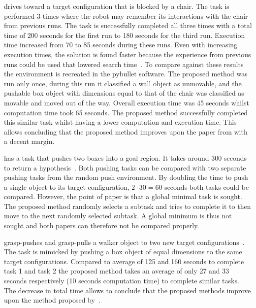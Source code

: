 \citeauthor{wang_affordancebased_2020} drives toward a target configuration that is blocked by a chair. The task is performed 3 times where the robot may remember its interactions with the chair from previous runs. The task is successfully completed all three times with a total time of 200 seconds for the first run to 180 seconds for the third run. Execution time increased from 70 to 85 seconds during these runs. Even with increasing execution times, the solution is found faster because the experience from previous runs could be used that lowered search time~\cite{wang_affordancebased_2020}. To compare against these results the environment is recreated in the pybullet software. The proposed method was run only once, during this run it classified a wall object as unmovable, and the pushable box object with dimensions equal to that of the chair was classified as movable and moved out of the way. Overall execution time was 45 seconds whilst computation time took 65 seconds. The proposed method successfully completed this similar task whilst having a lower computation and execution time. This allows concluding that the proposed method improves upon the paper from \citeauthor{wang_affordancebased_2020} with a decent margin.\bs

\citeauthor{vega-brown_asymptotically_2020} has a task that pushes two boxes into a goal region. It takes around 300 seconds to return a hypothesis~\cite{vega-brown_asymptotically_2020}. Both pushing tasks can be compared with two separate pushing tasks from the random push environment. By doubling the time to push a single object to its target configuration, $2 \cdot 30 = 60$ seconds both tasks could be compared. However, the point of \citeauthor{vega-brown_asymptotically_2020} paper is that a global minimal task is sought. The proposed method randomly selects a subtask and tries to complete it to then move to the next randomly selected subtask. A global minimum is thus not sought and both papers can therefore not be compared properly.\bs

\citeauthor{sabbaghnovin_model_2021} grasp-pushes and grasp-pulls a walker object to two new target configurations~\cite{sabbaghnovin_model_2021}. The task is mimicked by pushing a box object of equal dimensions to the same target configurations. Compared to \citeauthor{sabbaghnovin_model_2021} average of 125 and 160 seconds to complete task 1 and task 2 the proposed method takes an average of only 27 and 33 seconds respectively (10 seconds computation time) to complete similar tasks. The decrease in total time allows to conclude that the proposed methods improve upon the method proposed by~\citeauthor{sabbaghnovin_model_2021}.\bs

